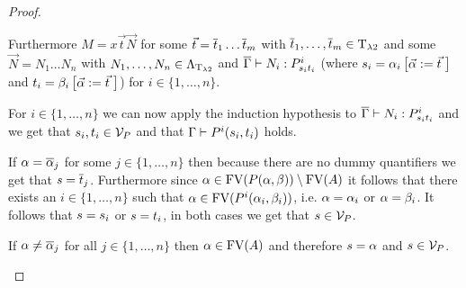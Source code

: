 \begin{proof}
\begin{itemize}

		Furthermore $M=x\vec{t}\vec{N}$ for some $\predTVec=\predTVec[1]\dots \predTVec[m]$ with $\predTVec[1],\dots,\predTVec[m]\in\lambdaTypes$ and some $\vec{N}=N_1\dots N_n$ with $N_1,\dots,N_n\in\Lambda_{\text{T}_{\lambda2}}$ and $\trans{\Gamma}\lambdaModels N_i:\code{P^i}{\predTFst[i]}{\predTSnd[i]}$ (where $\predTFst[i]=\predFst[i]\left[\predVec:=\predTVec\hspace{1mm}\right]$ and  $\predTSnd[i]=\predSnd[i]\left[\predVec:=\predTVec\hspace{1mm}\right]$) for $i\in\{1,\dots,n\}$.
		
		
		
		\begin{figure}[H]
			\centering
			
		\end{figure}
		
		For $i\in\{1,\dots,n\}$ we can now apply the induction hypothesis to $\trans{\Gamma}\lambdaModels N_i:\code{P^i}{\predTFst[i]}{\predTSnd[i]}$ and we get that $\predTFst[i],\predTSnd[i]\in\VarP$ and that $\Gamma\PModels P^i(\predTFst[i],\predTSnd[i])$ holds.
		
		If $\predFst=\predVec[j]$ for some $j\in\{1,\dots,n\}$ then because there are no dummy quantifiers we get that $\predTFst=\predTVec[j]$. Furthermore since $\alpha\in\FV(P(\predFst,\predSnd))\setminus\FV(A)$ it follows that there exists an $i\in\{1,\dots,n\}$ such that $\predFst\in\FV(P^i(\predFst[i],\predSnd[i]))$, i.e. $\predFst=\predFst[i]$ or $\predFst=\predSnd[i]$. It follows that $\predTFst=\predTFst[i]$ or $\predTFst=\predTSnd[i]$, in both cases we get that $\predTFst\in\VarP$.
		
		If $\predFst\neq\predVec[j]$ for all $j\in\{1,\dots,n\}$ then $\predFst\in\FV(A)$ and therefore $\predTFst=\predFst$ and $\predTFst\in\VarP$.
		

\end{itemize}
\end{proof}
